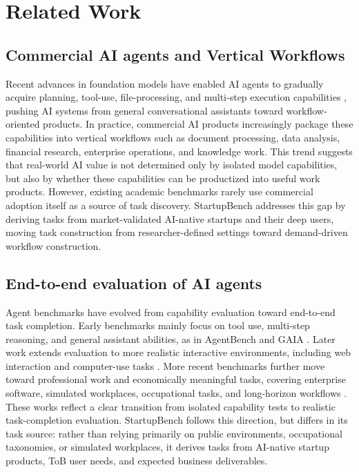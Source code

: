 \section{Related Work}
\subsection{Commercial AI agents and Vertical Workflows}
Recent advances in foundation models have enabled AI agents to gradually acquire planning, tool-use, file-processing, and multi-step execution capabilities \citep{yao2023react, schick2023toolformer}, pushing AI systems from general conversational assistants toward workflow-oriented products. In practice, commercial AI products increasingly package these capabilities into vertical workflows such as document processing, data analysis, financial research, enterprise operations, and knowledge work. This trend suggests that real-world AI value is not determined only by isolated model capabilities, but also by whether these capabilities can be productized into useful work products. However, existing academic benchmarks rarely use commercial adoption itself as a source of task discovery. StartupBench addresses this gap by deriving tasks from market-validated AI-native startups and their deep users, moving task construction from researcher-defined settings toward demand-driven workflow construction.

\subsection{End-to-end evaluation of AI agents}
Agent benchmarks have evolved from capability evaluation toward end-to-end task completion. Early benchmarks mainly focus on tool use, multi-step reasoning, and general assistant abilities, as in AgentBench and GAIA \citep{liu2024agentbench, mialon2024gaia}. Later work extends evaluation to more realistic interactive environments, including web interaction and computer-use tasks \citep{zhou2024webarena, xieosworld}. More recent benchmarks further move toward professional work and economically meaningful tasks, covering enterprise software, simulated workplaces, occupational tasks, and long-horizon workflows \citep{drouin2403workarena, xu2026theagentcompany, patwardhan2025gdpval, hu2026occubenchevaluatingaiagents, zhu2026workflowgymlonghorizonevaluationcomputeruse,meng2026dvworld}. These works reflect a clear transition from isolated capability tests to realistic task-completion evaluation. StartupBench follows this direction, but differs in its task source: rather than relying primarily on public environments, occupational taxonomies, or simulated workplaces, it derives tasks from AI-native startup products, ToB user needs, and expected business deliverables.
